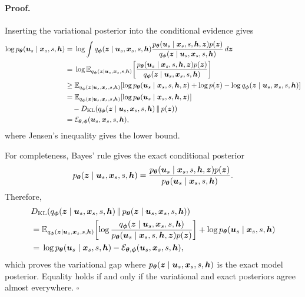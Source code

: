 \paragraph{Proof.}
Inserting the variational posterior into the conditional evidence gives
\begin{align*}
  \log p_{{\bm{\theta}}}({\bm{u}}_s\mid{\bm{x}}_s,s,{\bm{h}})
  &={}
  \log\int
  q_{\boldsymbol{\phi}}({\bm{z}}\mid{\bm{u}}_s,{\bm{x}}_s,s,{\bm{h}})
  \frac{
    p_{{\bm{\theta}}}({\bm{u}}_s\mid{\bm{x}}_s,s,{\bm{h}},{\bm{z}})p({\bm{z}})
  }{
    q_{\boldsymbol{\phi}}({\bm{z}}\mid{\bm{u}}_s,{\bm{x}}_s,s,{\bm{h}})
  }\,d{\bm{z}}
  \\
  &={}
  \log\mathbb{E}_{q_{\boldsymbol{\phi}}({\bm{z}}\mid{\bm{u}}_s,{\bm{x}}_s,s,{\bm{h}})}\!\left[
    \frac{
      p_{{\bm{\theta}}}({\bm{u}}_s\mid{\bm{x}}_s,s,{\bm{h}},{\bm{z}})p({\bm{z}})
    }{
      q_{\boldsymbol{\phi}}({\bm{z}}\mid{\bm{u}}_s,{\bm{x}}_s,s,{\bm{h}})
    }
  \right]
  \\
  &\geq
  \mathbb{E}_{q_{\boldsymbol{\phi}}({\bm{z}}\mid{\bm{u}}_s,{\bm{x}}_s,s,{\bm{h}})}\!\left[
    \log p_{{\bm{\theta}}}({\bm{u}}_s\mid{\bm{x}}_s,s,{\bm{h}},{\bm{z}})
    +\log p({\bm{z}})
    -\log q_{\boldsymbol{\phi}}({\bm{z}}\mid{\bm{u}}_s,{\bm{x}}_s,s,{\bm{h}})
  \right]
  \\
  &={}
  \mathbb{E}_{q_{\boldsymbol{\phi}}({\bm{z}}\mid{\bm{u}}_s,{\bm{x}}_s,s,{\bm{h}})}\!\left[
    \log p_{{\bm{\theta}}}({\bm{u}}_s\mid{\bm{x}}_s,s,{\bm{h}},{\bm{z}})
  \right]
  \\
  &\quad
  -D_{\mathrm{KL}}\!\left(
    q_{\boldsymbol{\phi}}({\bm{z}}\mid{\bm{u}}_s,{\bm{x}}_s,s,{\bm{h}})
    \,\Vert\,
    p({\bm{z}})
  \right)
  \\
  &={}
  \mathcal E_{{\bm{\theta}},\boldsymbol{\phi}}({\bm{u}}_s,{\bm{x}}_s,s,{\bm{h}}),
\end{align*}
where Jensen's inequality gives the lower bound. 

For completeness, Bayes' rule gives the exact conditional posterior
\begin{equation*}
  p_{{\bm{\theta}}}({\bm{z}}\mid{\bm{u}}_s,{\bm{x}}_s,s,{\bm{h}})
  =
  \frac{
    p_{{\bm{\theta}}}({\bm{u}}_s\mid{\bm{x}}_s,s,{\bm{h}},{\bm{z}})p({\bm{z}})
  }{
    p_{{\bm{\theta}}}({\bm{u}}_s\mid{\bm{x}}_s,s,{\bm{h}})
  }.
\end{equation*}
Therefore,
\begin{align*}
  &D_{\mathrm{KL}}\!\left(
    q_{\boldsymbol{\phi}}({\bm{z}}\mid{\bm{u}}_s,{\bm{x}}_s,s,{\bm{h}})
    \,\Vert\,
    p_{{\bm{\theta}}}({\bm{z}}\mid{\bm{u}}_s,{\bm{x}}_s,s,{\bm{h}})
  \right)
  \\
  &={}
  \mathbb{E}_{q_{\boldsymbol{\phi}}({\bm{z}}\mid{\bm{u}}_s,{\bm{x}}_s,s,{\bm{h}})}\!\left[
    \log\frac{
      q_{\boldsymbol{\phi}}({\bm{z}}\mid{\bm{u}}_s,{\bm{x}}_s,s,{\bm{h}})
    }{
      p_{{\bm{\theta}}}({\bm{u}}_s\mid{\bm{x}}_s,s,{\bm{h}},{\bm{z}})p({\bm{z}})
    }
  \right]
  +\log p_{{\bm{\theta}}}({\bm{u}}_s\mid{\bm{x}}_s,s,{\bm{h}})
  \\
  &={}
  \log p_{{\bm{\theta}}}({\bm{u}}_s\mid{\bm{x}}_s,s,{\bm{h}})
  -\mathcal E_{{\bm{\theta}},\boldsymbol{\phi}}({\bm{u}}_s,{\bm{x}}_s,s,{\bm{h}}),
\end{align*}
which proves the variational gap where $p_{{\bm{\theta}}}({\bm{z}}\mid{\bm{u}}_s,{\bm{x}}_s,s,{\bm{h}})$ is the exact model
posterior.  Equality holds if and only if the variational and exact posteriors
agree almost everywhere. \hfill$\square$

